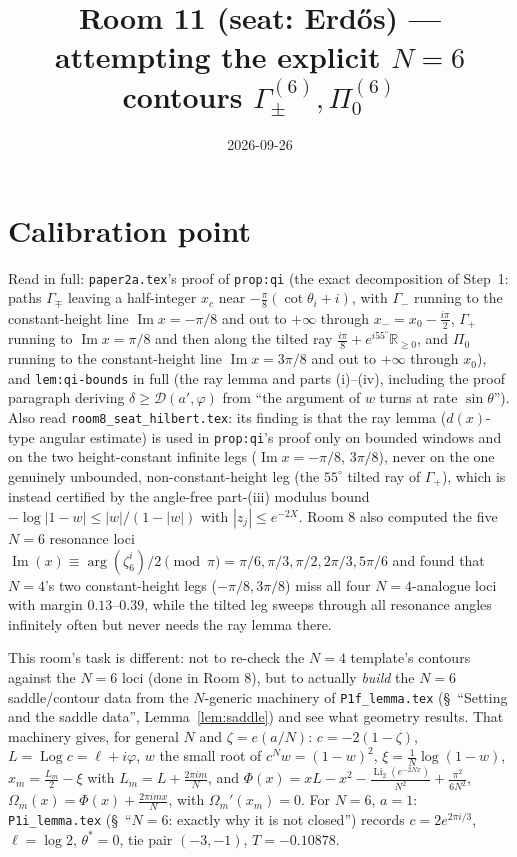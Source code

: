 \documentclass[11pt]{article}
\title{Room 11 (seat: Erd\H os) --- attempting the explicit $N=6$ contours
$\Gamma_\pm^{(6)},\Pi_0^{(6)}$}
\date{2026-09-26}
\begin{document}
\maketitle

\section*{Calibration point}

Read in full: \texttt{paper2a.tex}'s proof of \texttt{prop:qi} (the exact decomposition of Step~1:
paths $\Gamma_\mp$ leaving a half-integer $x_c$ near $-\frac\pi8(\cot\theta_i+i)$, with $\Gamma_-$
running to the constant-height line $\operatorname{Im}x=-\pi/8$ and out to $+\infty$ through
$x_-=x_0-\frac{i\pi}2$, $\Gamma_+$ running to $\operatorname{Im}x=\pi/8$ and then along the tilted
ray $\frac{i\pi}8+e^{i55^\circ}\mathbb R_{\ge0}$, and $\Pi_0$ running to the constant-height line
$\operatorname{Im}x=3\pi/8$ and out to $+\infty$ through $x_0$), and \texttt{lem:qi-bounds} in full
(the ray lemma and parts (i)--(iv), including the proof paragraph deriving $\delta\ge\mathcal
D(a',\varphi)$ from ``the argument of $w$ turns at rate $\sin\theta$''). Also read
\texttt{room8\_seat\_hilbert.tex}: its finding is that the ray lemma ($d(x)$-type angular estimate)
is used in \texttt{prop:qi}'s proof only on bounded windows and on the two height-constant infinite
legs ($\operatorname{Im}x=-\pi/8$, $3\pi/8$), never on the one genuinely unbounded, non-constant-height
leg (the $55^\circ$ tilted ray of $\Gamma_+$), which is instead certified by the angle-free part-(iii)
modulus bound $-\log|1-w|\le|w|/(1-|w|)$ with $|z_j|\le e^{-2X}$. Room 8 also computed the five $N=6$
resonance loci $\operatorname{Im}(x)\equiv\arg(\zeta_6^i)/2\pmod\pi=\pi/6,\pi/3,\pi/2,2\pi/3,5\pi/6$
and found that $N=4$'s two constant-height legs ($-\pi/8,3\pi/8$) miss all four $N=4$-analogue loci
with margin $0.13$--$0.39$, while the tilted leg sweeps through all resonance angles infinitely often
but never needs the ray lemma there.

This room's task is different: not to re-check the $N=4$ template's contours against the $N=6$ loci
(done in Room 8), but to actually \emph{build} the $N=6$ saddle/contour data from the $N$-generic
machinery of \texttt{P1f\_lemma.tex} (\S~``Setting and the saddle data'', Lemma~\ref{lem:saddle}) and
see what geometry results. That machinery gives, for general $N$ and $\zeta=e(a/N)$: $c=-2(1-\zeta)$,
$L=\operatorname{Log}c=\ell+i\varphi$, $w$ the small root of $c^Nw=(1-w)^2$, $\xi=\frac1N\log(1-w)$,
$x_m=\frac{L_m}2-\xi$ with $L_m=L+\frac{2\pi im}N$, and $\Phi(x)=xL-x^2-\frac{\operatorname{Li}_2(e^{-2Nx})}{N^2}+\frac{\pi^2}{6N^2}$, $\Omega_m(x)=\Phi(x)+\frac{2\pi imx}N$, with $\Omega_m'(x_m)=0$.
For $N=6$, $a=1$: \texttt{P1i\_lemma.tex} (\S~``$N=6$: exactly why it is not closed'') records
$c=2e^{2\pi i/3}$, $\ell=\log2$, $\theta^\ast=0$, tie pair $(-3,-1)$, $T=-0.10878$.
\end{document}
